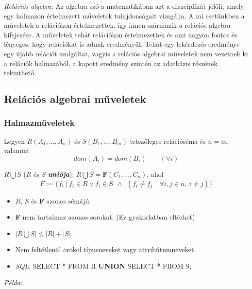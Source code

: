\documentclass[tikz,12pt,margin=0px]{article}
\begin{document}
    \noindent \textit{Relációs algebra}: Az algebra szó a matematikában azt a diszciplínát jelöli, amely egy halmazon értelmezett műveletek tulajdonságait vizsgálja. A mi esetünkben a műveletek a relációkon értelmezettek, így innen származik a relációs algebra kifejezése. A műveletek tehát relációkon értelmezettek és ami nagyon fontos és lényeges, hogy relációkat is adnak eredményül. Tehát egy lekérdezés eredménye egy újabb relációt szolgáltat, vagyis a relációs algebrai műveletek nem vezetnek ki a relációk halmazából, a kapott eredmény szintén az adatbázis részének tekinthető.\\

	\subsection*{Relációs algebrai műveletek}
	
	\subsubsection*{Halmazműveletek}

    Legyen $R(A_1, \ldots, A_n)$ és $S(B_1, \ldots, B_m)$ tetszőleges relációséma és $n = m$, valamint
    \[
        dom(A_i) = dom(B_i) \qquad (\forall i)
    \]

    \noindent $R \bigcup S$ ($R$ és $S$ \emph{\textbf{uniója}}): $R \bigcup S = \textbf{F}(C_1, \ldots, C_n)$, ahol
    \[
        F := \Big\{f_i\ \Big|\ f_i \in R \vee f_i \in S\ \ \wedge\ \ (f_i \neq f_j \quad  \forall i, j \in n,\ i \neq j)\Big\}
    \]
    \begin{itemize}
        \item $R$, $S$ és \textbf{F} azonos sémájú.
        \item \textbf{F} nem tartalmaz azonos sorokat. (Ez gyakorlatban eltérhet)
        \item $\Big|R \bigcup S\Big| \leq \Big|R\Big| + \Big|S\Big|$
        \item Nem feltétlenül örököl típusneveket vagy attribútumneveket.
        \item \emph{SQL}: SELECT * FROM R \textbf{UNION} SELECT * FROM S;
    \end{itemize}

    \noindent \textit{Példa}:
\end{document}
